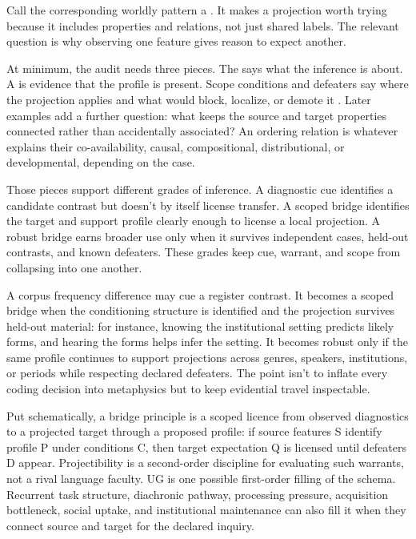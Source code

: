 \documentclass[12pt]{article}
\begin{document}
Call the corresponding worldly pattern a . It makes a projection worth trying because it includes properties and relations, not just shared labels. The relevant question is why observing one feature gives reason to expect another.

At minimum, the audit needs three pieces. The  says what the inference is about. A  is evidence that the profile is present. Scope conditions and defeaters say where the projection applies and what would block, localize, or demote it \citep{reynolds2026kindsProjectibilityProfiles}. Later examples add a further question: what  keeps the source and target properties connected rather than accidentally associated? An ordering relation is whatever explains their co-availability, causal, compositional, distributional, or developmental, depending on the case.

Those pieces support different grades of inference. A diagnostic cue identifies a candidate contrast but doesn't by itself license transfer. A scoped bridge identifies the target and support profile clearly enough to license a local projection. A robust bridge earns broader use only when it survives independent cases, held-out contrasts, and known defeaters. These grades keep cue, warrant, and scope from collapsing into one another.

A corpus frequency difference may cue a register contrast. It becomes a scoped bridge when the conditioning structure is identified and the projection survives held-out material: for instance, knowing the institutional setting predicts likely forms, and hearing the forms helps infer the setting. It becomes robust only if the same profile continues to support projections across genres, speakers, institutions, or periods while respecting declared defeaters. The point isn't to inflate every coding decision into metaphysics but to keep evidential travel inspectable.

Put schematically, a bridge principle is a scoped licence from observed diagnostics to a projected target through a proposed profile: if source features S identify profile P under conditions C, then target expectation Q is licensed until defeaters D appear. Projectibility is a second-order discipline for evaluating such warrants, not a rival language faculty. UG is one possible first-order filling of the schema. Recurrent task structure, diachronic pathway, processing pressure, acquisition bottleneck, social uptake, and institutional maintenance can also fill it when they connect source and target for the declared inquiry.
\end{document}
